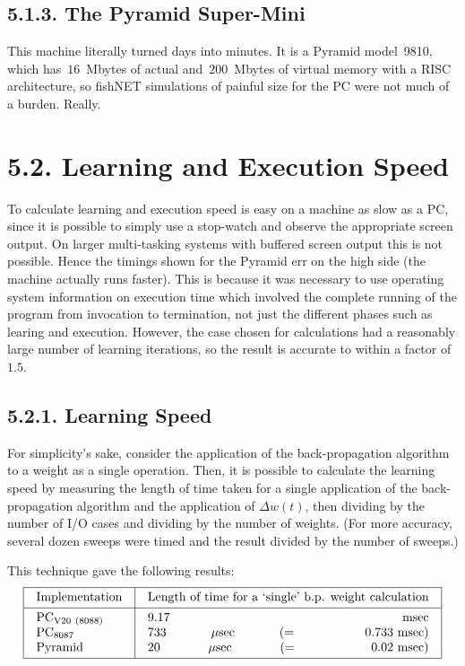 \documentclass[12pt]{report}
\begin{document}
\subsection{5.1.3. The Pyramid Super-Mini}

This machine literally turned days into minutes.
It is a Pyramid model~9810, which has~$16$~Mbytes of 
actual and~$200$~Mbytes of virtual
memory with a RISC architecture, so fishNET simulations 
of painful size for the PC were not much of a burden. 
Really.

\section{5.2. Learning and Execution Speed}

To calculate learning and execution speed is easy on a machine as
slow as a PC, since it is possible to simply use a stop-watch and
observe the appropriate screen output.
On larger multi-tasking systems with buffered screen output this is
not possible.
Hence the timings shown for the Pyramid err on the high side
(the machine actually runs faster).
This is because it was necessary to use operating system information
on execution time which involved the complete running of the
program from invocation to termination, not just the different
phases such as learing and execution.
However, the case chosen for calculations had a reasonably large
number of learning iterations, so the result is accurate to within a
factor of~$1.5$.

\subsection{5.2.1. Learning Speed}

For simplicity's sake, consider the application of the
back-propagation algorithm to a weight as a single operation.
Then, it is possible to calculate the learning speed by measuring
the length of time taken for a single application of the
back-propagation algorithm and the application of $\Delta w(t)$,
then dividing by the number of I/O cases and dividing by the number
of weights.
(For more accuracy, several dozen sweeps were timed and the result
divided by the number of sweeps.)

This technique gave the following results:
$$
\vbox{\offinterlineskip
\hrule
\halign{&\vrule#&\strut\quad#\quad\cr
height2pt&\omit&&\omit&\cr
&Implementation&&
	Length of time for a `single' b.p. weight calculation&\cr
height2pt&\omit&&\omit&\cr
\noalign{\hrule}
height2pt&\omit&&\omit&\cr
&PC$_{\rm V20\ (8088)}$&&$9.17$\ msec&\cr
&PC$_{\rm 8087}$&&$733$\ $\mu$sec\ $(=0.733{\rm \ msec})$&\cr
&Pyramid&&$20$\ $\mu$sec\ $(=0.02{\rm \ msec})$&\cr
height2pt&\omit&&\omit&\cr}
\hrule}
$$
\end{document}

